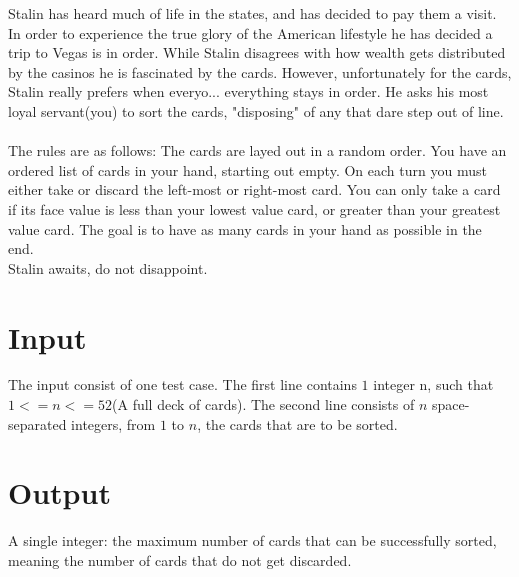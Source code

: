 Stalin has heard much of life in the states, and has decided to pay them a visit. 
In order to experience the true glory of the American lifestyle he has decided a trip to Vegas is in order. 
While Stalin disagrees with how wealth gets distributed by the casinos he is fascinated by the cards.
However, unfortunately for the cards, Stalin really prefers when everyo... everything stays in order. 
He asks his most loyal servant(you) to sort the cards, "disposing" of any that dare step out of line.
\\ \\
The rules are as follows:
The cards are layed out in a random order. You have an ordered list of cards in your hand, starting out empty.
On each turn you must either take or discard the left-most or right-most card. 
You can only take a card if its face value is less than your lowest value card, or greater than your greatest value card. 
The goal is to have as many cards in your hand as possible in the end. \\

Stalin awaits, do not disappoint. 

\section*{Input}
The input consist of one test case. The first line contains $1$ integer n, such that $1 <= n <= 52$(A full deck of cards).
The second line consists of $n$ space-separated integers, from $1$ to $n$, the cards that are to be sorted. 

\section*{Output}
A single integer: the maximum number of cards that can be successfully sorted, meaning the number of cards that 
do not get discarded. 